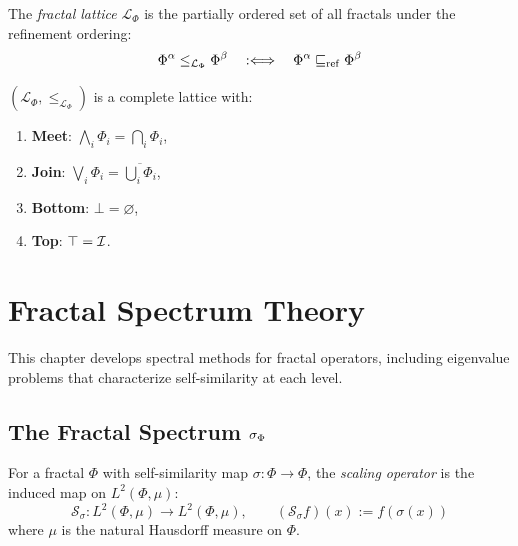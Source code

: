 \begin{definition}
\label{def:frac-lattice}
The \emph{fractal lattice} $\mathcal{L}_\Phi$ is the partially ordered set
of all fractals under the refinement ordering:
\[
    \Phi^{\alpha} \leq_{\mathcal{L}_\Phi} \Phi^{\beta}
    \quad:\Longleftrightarrow\quad
    \Phi^{\alpha} \sqsubseteq_{\mathrm{ref}} \Phi^{\beta}
\]
\end{definition}

\begin{theorem}
\label{thm:lattice-structure}
$(\mathcal{L}_\Phi, \leq_{\mathcal{L}_\Phi})$ is a complete lattice with:
\begin{enumerate}[label=(\alph*)]
    \item \textbf{Meet}: $\bigwedge_i \Phi_i = \bigcap_i \Phi_i$,
    \item \textbf{Join}: $\bigvee_i \Phi_i = \overline{\bigcup_i \Phi_i}$,
    \item \textbf{Bottom}: $\bot = \varnothing$,
    \item \textbf{Top}: $\top = \mathcal{I}$.
\end{enumerate}
\end{theorem}


\chapter{Fractal Spectrum Theory}
\label{ch:spectrum}

\begin{tcolorbox}[colback=blue!5!white,colframe=blue!75!black,title=\vnewfour]
This chapter develops spectral methods for fractal operators, including
eigenvalue problems that characterize self-similarity at each level.
\end{tcolorbox}

\section{The Fractal Spectrum $\sigma_\Phi$}

\begin{definition}
\label{def:scaling-op}
For a fractal $\Phi$ with self-similarity map $\sigma: \Phi \to \Phi$,
the \emph{scaling operator} is the induced map on $L^2(\Phi, \mu)$:
\[
    \mathcal{S}_\sigma: L^2(\Phi, \mu) \longrightarrow L^2(\Phi, \mu), \qquad
    (\mathcal{S}_\sigma f)(x) := f(\sigma(x))
\]
where $\mu$ is the natural Hausdorff measure on $\Phi$.
\end{definition}

